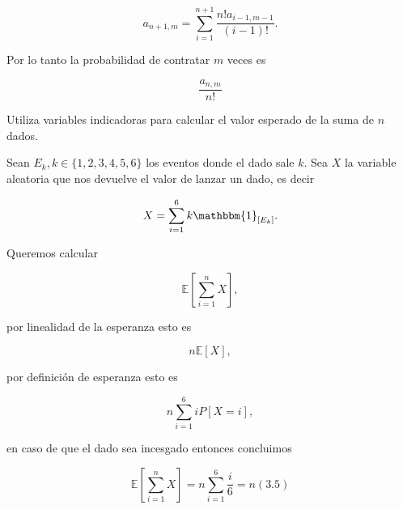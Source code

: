 \documentclass[answers,11pt]{exam}
\begin{document}
\begin{questions}
\[a_{n+1,m} = \sum_{i=1}^{n+1} \frac{n!a_{i-1,m-1}}{(i-1)!}.\]

Por lo tanto la probabilidad de contratar $m$ veces es

\[\frac{a_{n,m}}{n!}\]

\question
Utiliza variables indicadoras para calcular el valor esperado de la suma de $n$ dados. 

Sean $E_k, k\in\{1,2,3,4,5,6\}$ los eventos donde el dado sale $k$. Sea $X$ la variable aleatoria que nos devuelve el valor de lanzar un dado, es decir

\[X = \sum_{i=1}^6 k\mathbbm{1}_{[E_k]}.\]

Queremos calcular

\[\mathbb{E}\left[\sum_{i=1}^n X\right],\]

por linealidad de la esperanza esto es

\[n\mathbb{E}\left[X\right],\]

por definición de esperanza esto es

\[n\sum_{i=1}^6 iP[X=i],\]

en caso de que el dado sea incesgado entonces concluimos

\[\mathbb{E}\left[\sum_{i=1}^n X\right] = n\sum_{i=1}^6\frac{i}{6} = n(3.5)\]

\end{questions}
\end{document}
